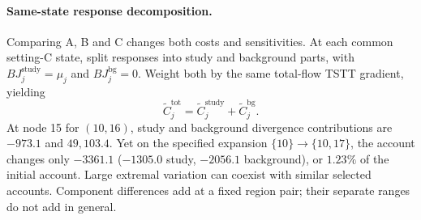 \paragraph{Same-state response decomposition.}\label{subsec:bgsplit}
Comparing A, B and C changes both costs and sensitivities. At each common setting-C state, split responses into study and background parts, with $BJ_j^{\mathrm{study}}=\mu_j$ and $BJ_j^{\mathrm{bg}}=0$. Weight both by the same total-flow TSTT gradient, yielding
\begin{equation}
\widetilde C_j^{\mathrm{tot}}=\widetilde C_j^{\mathrm{study}}+\widetilde C_j^{\mathrm{bg}}.
\label{eq:bg_attribution}
\end{equation}
At node 15 for $(10,16)$, study and background divergence contributions are $-973.1$ and $49{,}103.4$. Yet on the specified expansion $\{10\}\to\{10,17\}$, the account changes only $-3361.1$ ($-1305.0$ study, $-2056.1$ background), or $1.23\%$ of the initial account. Large extremal variation can coexist with similar selected accounts. Component differences add at a fixed region pair; their separate ranges do not add in general.

